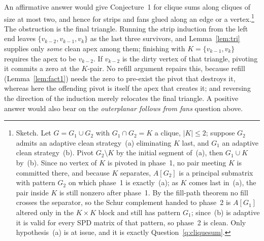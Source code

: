 \documentclass[11pt]{article}
\theoremstyle{plain}
\theoremstyle{definition}
\begin{document}
\begin{humanblock}
An affirmative answer would give Conjecture~1 for clique sums along cliques of size at most two, and
hence for strips and fans glued along an edge or a vertex.\footnote{%
Sketch. Let $G=G_1\cup G_2$ with $G_1\cap G_2=K$ a clique, $|K|\le2$; suppose $G_2$ admits an adaptive
clean strategy~(a) eliminating $K$ last, and $G_1$ an adaptive clean strategy~(b). Pivot
$G_2\setminus K$ by the initial segment of~(a), then $G_1\cup K$ by~(b). Since no vertex of $K$ is
pivoted in phase~1, no pair meeting $K$ is committed there, and because $K$ separates, $A[G_2]$ is a
principal submatrix with pattern $G_2$ on which phase~1 is exactly~(a); as $K$ comes last in~(a), the
pair inside $K$ is still nonzero after phase~1. By the fill-path theorem no fill crosses the
separator, so the Schur complement handed to phase~2 is $A[G_1]$ altered only in the $K\times K$ block
and still has pattern $G_1$; since~(b) is adaptive it is valid for every SPD matrix of that pattern,
so phase~2 is clean. Only hypothesis~(a) is at issue, and it is exactly
Question~\ref{q:cliquesum}.}
The obstruction is the final triangle. Running the strip induction from the left end leaves
$\{v_{k-2},v_{k-1},v_k\}$ as the last three survivors, and Lemma~\ref{lem:tri} supplies only
\emph{some} clean apex among them; finishing with $K=\{v_{k-1},v_k\}$ requires the apex to be
$v_{k-2}$. If $v_{k-2}$ is the dirty vertex of that triangle, pivoting it commits a zero at the
$K$-pair. No refill argument repairs this, because refill (Lemma~\ref{lem:fact1}) needs the zero to
pre-exist the pivot that destroys it, whereas here the offending pivot is itself the apex that creates
it; and reversing the direction of the induction merely relocates the final triangle. A positive
answer would also bear on the \emph{outerplanar follows from fans} question above.
\end{humanblock}
\end{document}
